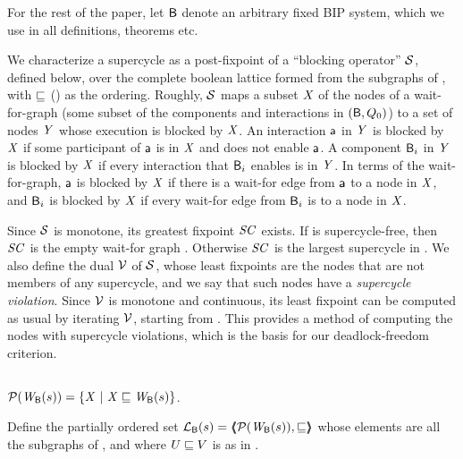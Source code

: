 For the rest of the paper, let $\mathsf{B}$ denote an arbitrary fixed BIP system, which
we use in all definitions, theorems etc.

We characterize a supercycle as a post-fixpoint of a ``blocking operator'' $\mathcal{S}$, defined below, over the complete boolean lattice formed from the
subgraphs of , with $\sqsubseteq$ () as the ordering.
%
Roughly, $\mathcal{S}$ maps a subset $\mathit{X}$ of the nodes of a wait-for-graph (\ie some subset of the components and interactions in $(\mathsf{B}, Q_0)$)
to a set of nodes $\mathit{Y}$ whose execution is blocked by $\mathit{X}$. An interaction $\mathsf{a}$ in $\mathit{Y}$ is blocked by $\mathit{X}$ if some participant of $\mathsf{a}$ is in $\mathit{X}$ and does
not enable $\mathsf{a}$. A component $\mathsf{B}_i$  in $\mathit{Y}$ is blocked by $\mathit{X}$ if every interaction that $\mathsf{B}_i$ enables is in $\mathit{Y}$. In terms of the wait-for-graph, 
$\mathsf{a}$ is blocked by $\mathit{X}$ if there is a wait-for edge from $\mathsf{a}$ to a node in $\mathit{X}$, and $\mathsf{B}_i$ is blocked by $\mathit{X}$ if every wait-for edge from $\mathsf{B}_i$ is to a
node in $\mathit{X}$. 

Since $\mathcal{S}$ is monotone, its greatest fixpoint $\mathit{SC}$ exists.  If  is supercycle-free, then $\mathit{SC}$ is the empty wait-for graph \ewfg.
Otherwise $\mathit{SC}$ is the largest supercycle in .  We also define the dual $\mathcal{V}$ of $\mathcal{S}$, whose least fixpoints are the nodes that are not
members of any supercycle, and we say that such nodes have a \emph{supercycle violation}. Since 
$\mathcal{V}$ is monotone and continuous, its least fixpoint can be computed as usual by iterating $\mathcal{V}$, starting from \ewfg.
This provides a method of computing the nodes with supercycle violations, which is the basis for our deadlock-freedom criterion.



\subsection{}
\label{secn:supercycle-fixpoint}

\begin{definition} \label{defn:wsetOfSubgraphs}
$\mathcal{P}(\mathit{W}_{\mathsf{B}}({s})) = \{  \mathit{X} ~|~ \mathit{X} \sqsubseteq \mathit{W}_{\mathsf{B}}({s})  \}$.
\end{definition}


\begin{definition} \label{defn:wflattice}
Define the partially ordered set $\mathcal{L}_{\mathsf{B}}({s}) = \langle \hspace{-0.34em} \langle \hspace{-0.34em} \langle  \mathcal{P}(\mathit{W}_{\mathsf{B}}({s})), \sqsubseteq  \rangle \hspace{-0.34em} \rangle \hspace{-0.34em} \rangle$ %
whose elements are all the subgraphs of 
, and where  $U \sqsubseteq V$ is as in .   
\end{definition}

